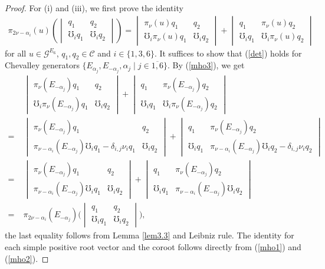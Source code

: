 \documentclass[12pt]{article}
\numberwithin{equation}{section}
\theoremstyle{definition}
\theoremstyle{remark}
\begin{document}
\begin{proof}
	For (i) and (iii), we first prove the identity
	\begin{align}
		\pi_{2\nu-\alpha_i}(u)\left( \begin{vmatrix}
			q_1&q_2\\ \mho_iq_1&\mho_iq_2
		\end{vmatrix}\right) =\begin{vmatrix}
		\pi_{\nu}(u)q_1&q_2\\ \mho_i\pi_{\nu}(u)q_1&\mho_iq_2
		\end{vmatrix}+\begin{vmatrix}
		q_1&\pi_{\nu}(u)q_2\\ \mho_iq_1&\mho_i\pi_{\nu}(u)q_2
		\end{vmatrix}\label{det}
	\end{align}
	for all $u\in\mathscr{G}^{E_6}$, $q_1,q_2\in\mathscr{C}$ and $i\in\{1,3,6\}$. It suffices to show that (\ref{det}) holds for Chevalley generators $\{E_{\alpha_j},E_{-\alpha_j},\alpha_j\mid j\in\overline{1,6}\}$. By (\ref{mho3}), we get
	\begin{align}
		&\;\begin{vmatrix}
			\pi_{\nu}(E_{-\alpha_j})q_1&q_2\\ \mho_i\pi_{\nu}(E_{-\alpha_j})q_1&\mho_iq_2
		\end{vmatrix}+\begin{vmatrix}
			q_1&\pi_{\nu}(E_{-\alpha_j})q_2\\ \mho_iq_1&\mho_i\pi_{\nu}(E_{-\alpha_j})q_2
		\end{vmatrix}\nonumber\\
		=&\;\begin{vmatrix}
			\pi_{\nu}(E_{-\alpha_j})q_1&q_2\\ \pi_{\nu-\alpha_i}(E_{-\alpha_j})\mho_iq_1-\delta_{i,j}\nu_iq_1&\mho_iq_2
		\end{vmatrix}+\begin{vmatrix}
			q_1&\pi_{\nu}(E_{-\alpha_j})q_2\\ \mho_iq_1&\pi_{\nu-\alpha_i}(E_{-\alpha_j})\mho_iq_2-\delta_{i,j}\nu_iq_2
		\end{vmatrix}\nonumber\\
		=&\;\begin{vmatrix}
			\pi_{\nu}(E_{-\alpha_j})q_1&q_2\\ \pi_{\nu-\alpha_i}(E_{-\alpha_j})\mho_iq_1&\mho_iq_2
		\end{vmatrix}+\begin{vmatrix}
			q_1&\pi_{\nu}(E_{-\alpha_j})q_2\\ \mho_iq_1&\pi_{\nu-\alpha_i}(E_{-\alpha_j})\mho_iq_2
		\end{vmatrix}\nonumber\\
		=&\;\pi_{2\nu-\alpha_i}(E_{-\alpha_j})\big( \begin{vmatrix}
			q_1&q_2\\ \mho_iq_1&\mho_iq_2
		\end{vmatrix}\big), \label{4.64}
	\end{align}
	the last equality follows from Lemma \ref{lem3.3} and Leibniz rule.
 	The identity for each simple positive root vector and the coroot follows directly from (\ref{mho1}) and (\ref{mho2}). 
 	

\end{proof}
\end{document}
